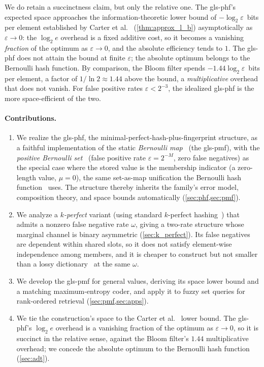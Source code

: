 \documentclass[ ../main.tex]{subfiles}
\begin{document}
We do retain a succinctness claim, but only the relative one. The
\gls{gls-phf}'s expected space approaches the information-theoretic lower bound
of $-\log_2 \varepsilon$~bits per element established by Carter et
al.~\cite{carter1978} (\cref{thm:approx_l_b}) asymptotically as
$\varepsilon \to 0$: the $\log_2 e$ overhead is a fixed additive cost, so it
becomes a vanishing \emph{fraction} of the optimum as $\varepsilon \to 0$, and
the absolute efficiency tends to $1$. The \gls{gls-phf} does not attain the bound
at finite $\varepsilon$; the absolute optimum belongs to the Bernoulli hash
function. By comparison, the Bloom filter spends $-1.44 \log_2 \varepsilon$~bits
per element, a factor of $1/\ln 2 \approx 1.44$ above the bound, a
\emph{multiplicative} overhead that does not vanish. For false positive rates
$\varepsilon < 2^{-3}$, the idealized \gls{gls-phf} is the more space-efficient
of the two.

\paragraph{Contributions.}
\begin{enumerate}
    \item We realize the \gls{gls-phf}, the minimal-perfect-hash-plus-fingerprint
    structure, as a faithful implementation of the static \emph{Bernoulli
    map}~\cite{bmaps} (the \gls{gls-pmf}), with the \emph{positive Bernoulli
    set}~\cite{bsets} (false positive rate $\varepsilon = 2^{-M}$, zero false
    negatives) as the special case where the stored value is the membership
    indicator (a zero-length value, $\mu = 0$), the same set-as-map unification
    the Bernoulli hash function~\cite{shs} uses. The structure thereby inherits
    the family's error model, composition theory, and space bounds automatically
    (\cref{sec:phf,sec:pmf}).
    \item We analyze a \emph{$k$-perfect} variant (using standard $k$-perfect
    hashing~\cite{chd}) that admits a nonzero false negative rate $\omega$,
    giving a two-rate structure whose marginal channel is binary asymmetric
    (\cref{sec:k_perfect}). Its false negatives are dependent within shared
    slots, so it does not satisfy element-wise independence among members, and
    it is cheaper to construct but not smaller than a lossy
    dictionary~\cite{pagh2001lossy} at the same $\omega$.
    \item We develop the \gls{gls-pmf} for general values, deriving its space
    lower bound and a matching maximum-entropy coder, and apply it to fuzzy set
    queries for rank-ordered retrieval (\cref{sec:pmf,sec:apps}).
    \item We tie the construction's space to the Carter et al.~\cite{carter1978}
    lower bound. The \gls{gls-phf}'s $\log_2 e$ overhead is a vanishing fraction
    of the optimum as $\varepsilon \to 0$, so it is succinct in the relative
    sense, against the Bloom filter's $1.44$ multiplicative overhead; we concede
    the absolute optimum to the Bernoulli hash function~\cite{shs}
    (\cref{sec:adt}).
\end{enumerate}
\end{document}
